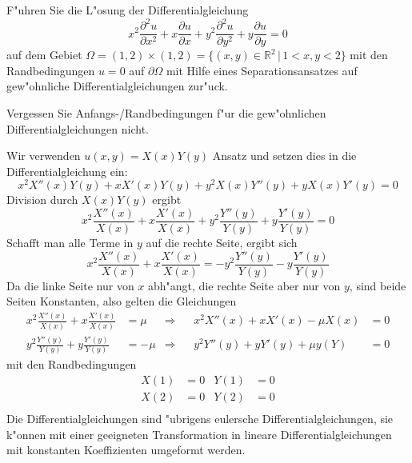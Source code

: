 F"uhren Sie die L"osung der Differentialgleichung
\[
x^2\frac{\partial^2 u}{\partial x^2}
+x\frac{\partial u}{\partial x}
+y^2\frac{\partial^2 u}{\partial y^2}
+y\frac{\partial u}{\partial y}
=0
\]
auf dem Gebiet
$\Omega=(1,2)\times(1,2)=\{ (x,y)\in\mathbb R^2\,|\, 1<x,y<2\}$
mit den Randbedingungen
$u=0$ auf $\partial\Omega$
mit Hilfe eines Separationsansatzes auf gew"ohnliche Differentialgleichungen
zur"uck.

\begin{hinweis}
Vergessen Sie Anfangs-/Randbedingungen f"ur die gew"ohnlichen
Differentialgleichungen nicht.
\end{hinweis}

\begin{loesung}
Wir verwenden $u(x,y)=X(x)Y(y)$ Ansatz und setzen dies in die
Differentialgleichung ein:
\[
x^2X''(x)Y(y)
+xX'(x)Y(y)
+y^2X(x)Y''(y)
+yX(x)Y'(y)=0
\]
Division durch $X(x)Y(y)$ ergibt
\[
x^2\frac{X''(x)}{X(x)}
+x\frac{X'(x)}{X(x)}
+y^2\frac{Y''(y)}{Y(y)}
+y\frac{Y'(y)}{Y(y)}=0
\]
Schafft man alle Terme in $y$ auf die rechte Seite, ergibt sich
\[
x^2\frac{X''(x)}{X(x)}
+x\frac{X'(x)}{X(x)}
=
-y^2\frac{Y''(y)}{Y(y)}
-y\frac{Y'(y)}{Y(y)}
\]
Da die linke Seite nur von $x$ abh"angt, die rechte Seite aber nur
von $y$, sind beide Seiten Konstanten, also gelten die
Gleichungen
\begin{align*}
x^2\frac{X''(x)}{X(x)}
+x\frac{X'(x)}{X(x)}&=\mu
&\Rightarrow&
&
x^2X''(x)+xX'(x)-\mu X(x)&=0
\\
y^2\frac{Y''(y)}{Y(y)}
+y\frac{Y'(y)}{Y(y)}&=-\mu
&\Rightarrow&
&
y^2Y''(y)+yY'(y)+\mu y(Y)&=0
\end{align*}
mit den Randbedingungen
\begin{align*}
X(1)&=0&Y(1)&=0\\
X(2)&=0&Y(2)&=0\\
\end{align*}
Die Differentialgleichungen sind "ubrigens eulersche Differentialgleichungen,
sie k"onnen mit einer geeigneten Transformation in lineare
Differentialgleichungen mit konstanten Koeffizienten umgeformt werden.
\end{loesung}
